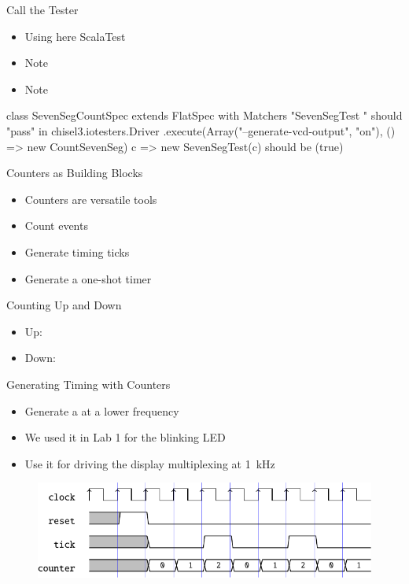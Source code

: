 \begin{frame}[fragile]{Call the Tester}
\begin{itemize}
\item Using here ScalaTest
\item Note 
\item Note 
\end{itemize}
\begin{chisel}
class SevenSegCountSpec extends
  FlatSpec with Matchers {
  "SevenSegTest " should "pass" in {
  chisel3.iotesters.Driver
  .execute(Array("--generate-vcd-output", "on"),
    () => new CountSevenSeg)
    { c => new SevenSegTest(c)} should be (true) }
}
\end{chisel}
\end{frame}




\begin{frame}[fragile]{Counters as Building Blocks}
\begin{itemize}
\item Counters are versatile tools
\item Count events
\item Generate timing ticks
\item Generate a one-shot timer
\end{itemize}
\end{frame}

\begin{frame}[fragile]{Counting Up and Down}
\begin{itemize}
\item Up:
\item Down:
\end{itemize}
\end{frame}

\begin{frame}[fragile]{Generating Timing with Counters}
\begin{itemize}
\item Generate a  at a lower frequency
\item We used it in Lab 1 for the blinking LED
\item Use it for driving the display multiplexing at 1~kHz
\end{itemize}
\begin{figure}
  \includegraphics[scale=0.8]{../figures/tick_wave}
\end{figure}
\end{frame}


